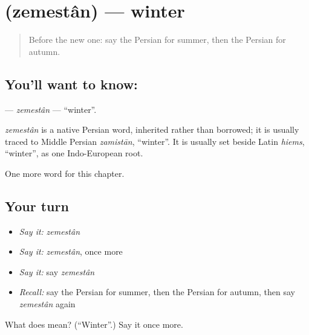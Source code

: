 \section[\texorpdfstring{\fa{زمستان} (zemestân)}{زمستان (zemestân)}]{ (zemestân) — winter}

\label{lesson:FA-C80-zemestan}



\begin{quote}
Before the new one: say the Persian for summer, then the Persian for autumn.
\end{quote}

\subsection*{You'll want to know: }
\textbf{} — \emph{zemestân} — \textquotedblleft{}winter\textquotedblright{}.

\begin{cousinweb}
\emph{zemestân} is a native Persian word, inherited rather than borrowed; it is usually traced to Middle Persian \emph{zamistān}, \textquotedblleft{}winter\textquotedblright{}. It is usually set beside Latin \emph{hiems}, \textquotedblleft{}winter\textquotedblright{}, as one Indo-European root.
\end{cousinweb}

\begin{grammarlens}[title={What you've built}]
One more word for this chapter.
\end{grammarlens}

\subsection*{Your turn}
\begin{itemize}
\raggedright
  \item \emph{Say it:} \emph{zemestân}
  \item \emph{Say it:} \emph{zemestân}, once more
  \item \emph{Say it:} say \emph{zemestân}
  \item \emph{Recall:} say the Persian for summer, then the Persian for autumn, then say \emph{zemestân} again
\end{itemize}

\begin{tcolorbox}[breakable,colback=teal!4,colframe=teal!35!black,title={Before you move on}]
What does  mean? (\textquotedblleft{}Winter\textquotedblright{}.) Say it once more.
\end{tcolorbox}
